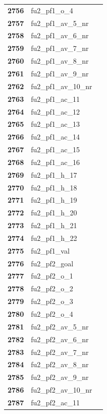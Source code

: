 \documentclass[
  letterpaper,
  DIV=11,
  numbers=noendperiod]{scrartcl}
\begin{document}
\begin{longtable}[t]{>{}cll}
\addlinespace
\textbf{2756} & fu2\_pf1\_o\_4 & \\
\textbf{2757} & fu2\_pf1\_av\_5\_nr & \\
\textbf{2758} & fu2\_pf1\_av\_6\_nr & \\
\textbf{2759} & fu2\_pf1\_av\_7\_nr & \\
\textbf{2760} & fu2\_pf1\_av\_8\_nr & \\
\addlinespace
\textbf{2761} & fu2\_pf1\_av\_9\_nr & \\
\textbf{2762} & fu2\_pf1\_av\_10\_nr & \\
\textbf{2763} & fu2\_pf1\_ac\_11 & \\
\textbf{2764} & fu2\_pf1\_ac\_12 & \\
\textbf{2765} & fu2\_pf1\_ac\_13 & \\
\addlinespace
\textbf{2766} & fu2\_pf1\_ac\_14 & \\
\textbf{2767} & fu2\_pf1\_ac\_15 & \\
\textbf{2768} & fu2\_pf1\_ac\_16 & \\
\textbf{2769} & fu2\_pf1\_h\_17 & \\
\textbf{2770} & fu2\_pf1\_h\_18 & \\
\addlinespace
\textbf{2771} & fu2\_pf1\_h\_19 & \\
\textbf{2772} & fu2\_pf1\_h\_20 & \\
\textbf{2773} & fu2\_pf1\_h\_21 & \\
\textbf{2774} & fu2\_pf1\_h\_22 & \\
\textbf{2775} & fu2\_pf1\_val & \\
\addlinespace
\textbf{2776} & fu2\_pf2\_goal & \\
\textbf{2777} & fu2\_pf2\_o\_1 & \\
\textbf{2778} & fu2\_pf2\_o\_2 & \\
\textbf{2779} & fu2\_pf2\_o\_3 & \\
\textbf{2780} & fu2\_pf2\_o\_4 & \\
\addlinespace
\textbf{2781} & fu2\_pf2\_av\_5\_nr & \\
\textbf{2782} & fu2\_pf2\_av\_6\_nr & \\
\textbf{2783} & fu2\_pf2\_av\_7\_nr & \\
\textbf{2784} & fu2\_pf2\_av\_8\_nr & \\
\textbf{2785} & fu2\_pf2\_av\_9\_nr & \\
\addlinespace
\textbf{2786} & fu2\_pf2\_av\_10\_nr & \\
\textbf{2787} & fu2\_pf2\_ac\_11 & \\

\end{longtable}
\end{document}
